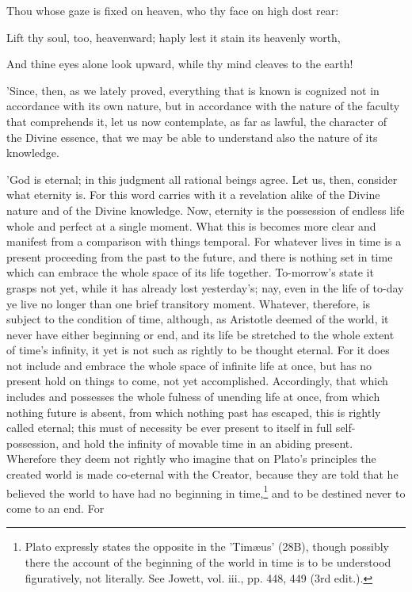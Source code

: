 Thou whose gaze is fixed on heaven, who thy face on high dost rear:

Lift thy soul, too, heavenward; haply lest it stain its heavenly worth,

And thine eyes alone look upward, while thy mind cleaves to the earth!


'Since, then, as we lately proved, everything that is known is cognized
not in accordance with its own nature, but in accordance with the nature
of the faculty that comprehends it, let us now contemplate, as far as
lawful, the character of the Divine essence, that we may be able to
understand also the nature of its knowledge.

'God is eternal; in this judgment all rational beings agree. Let us,
then, consider what eternity is. For this word carries with it a
revelation alike of the Divine nature and of the Divine knowledge. Now,
eternity is the possession of endless life whole and perfect at a single
moment. What this is becomes more clear and manifest from a comparison
with things temporal. For whatever lives in time is a present proceeding
from the past to the future, and there is nothing set in time which can
embrace the whole space of its life together. To-morrow's state it
grasps not yet, while it has already lost yesterday's; nay, even in the
life of to-day ye live no longer than one brief transitory moment.
Whatever, therefore, is subject to the condition of time, although, as
Aristotle deemed of the world, it never have either beginning or end,
and its life be stretched to the whole extent of time's infinity, it yet
is not such as rightly to be thought eternal. For it does not include
and embrace the whole space of infinite life at once, but has no present
hold on things to come, not yet accomplished. Accordingly, that which
includes and possesses the whole fulness of unending life at once, from
which nothing future is absent, from which nothing past has escaped,
this is rightly called eternal; this must of necessity be ever present
to itself in full self-possession, and hold the infinity of movable time
in an abiding present. Wherefore they deem not rightly who imagine that
on Plato's principles the created world is made co-eternal with the
Creator, because they are told that he believed the world to have had
no beginning in time,\footnote{Plato expressly states the opposite in the 'Timæus' (28B),
though possibly there the account of the beginning of the world in time
is to be understood figuratively, not literally. See Jowett, vol. iii.,
pp. 448, 449 (3rd edit.).} and to be destined never to come to an end. For
